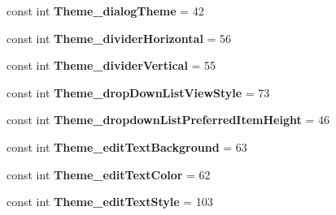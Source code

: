 \begin{DoxyCompactItemize}
\item 
\hypertarget{classClient_1_1Droid_1_1Resource_1_1Styleable_a8234d7d8126da9c35e11bad9f2306e97}{}const int {\bfseries Theme\+\_\+dialog\+Theme} = 42\label{classClient_1_1Droid_1_1Resource_1_1Styleable_a8234d7d8126da9c35e11bad9f2306e97}

\item 
\hypertarget{classClient_1_1Droid_1_1Resource_1_1Styleable_a7caf4e160e46780c8b41a35fe760a088}{}const int {\bfseries Theme\+\_\+divider\+Horizontal} = 56\label{classClient_1_1Droid_1_1Resource_1_1Styleable_a7caf4e160e46780c8b41a35fe760a088}

\item 
\hypertarget{classClient_1_1Droid_1_1Resource_1_1Styleable_a5d32b0a15c29ad60c38bfc75a2901800}{}const int {\bfseries Theme\+\_\+divider\+Vertical} = 55\label{classClient_1_1Droid_1_1Resource_1_1Styleable_a5d32b0a15c29ad60c38bfc75a2901800}

\item 
\hypertarget{classClient_1_1Droid_1_1Resource_1_1Styleable_a31a5a7d30f7594e625ece5172646b04a}{}const int {\bfseries Theme\+\_\+drop\+Down\+List\+View\+Style} = 73\label{classClient_1_1Droid_1_1Resource_1_1Styleable_a31a5a7d30f7594e625ece5172646b04a}

\item 
\hypertarget{classClient_1_1Droid_1_1Resource_1_1Styleable_a78fe9566e850f1e313969a3b76332563}{}const int {\bfseries Theme\+\_\+dropdown\+List\+Preferred\+Item\+Height} = 46\label{classClient_1_1Droid_1_1Resource_1_1Styleable_a78fe9566e850f1e313969a3b76332563}

\item 
\hypertarget{classClient_1_1Droid_1_1Resource_1_1Styleable_a77e104965ca8436305715cb5a4619701}{}const int {\bfseries Theme\+\_\+edit\+Text\+Background} = 63\label{classClient_1_1Droid_1_1Resource_1_1Styleable_a77e104965ca8436305715cb5a4619701}

\item 
\hypertarget{classClient_1_1Droid_1_1Resource_1_1Styleable_a1c4f0f4915563282c868024bfbb7a1b4}{}const int {\bfseries Theme\+\_\+edit\+Text\+Color} = 62\label{classClient_1_1Droid_1_1Resource_1_1Styleable_a1c4f0f4915563282c868024bfbb7a1b4}

\item 
\hypertarget{classClient_1_1Droid_1_1Resource_1_1Styleable_aa6c4ca25e3fdb942a453d728654ca696}{}const int {\bfseries Theme\+\_\+edit\+Text\+Style} = 103\label{classClient_1_1Droid_1_1Resource_1_1Styleable_aa6c4ca25e3fdb942a453d728654ca696}


\end{DoxyCompactItemize}
